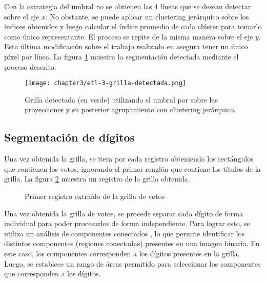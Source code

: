 Con la estrategia del umbral no se obtienen las 4 líneas que se desean detectar sobre el eje $x$. No obstante, se puede
aplicar un clustering jerárquico sobre los índices obtenidos y luego calcular el índice promedio de cada clúster para
tomarlo como único representante. El proceso se repite de la misma manera sobre el eje $y$. Esta última modificación
sobre el trabajo realizado en \parencite{lamagna2016lectura} asegura tener un único píxel por línea. La figura \ref{fig:etl-3-grilla-detectada} muestra
la segmentación detectada mediante el proceso descrito.

\begin{figure}[H]
    \centering
    \texttt{[image: chapter3/etl-3-grilla-detectada.png]}
    \caption[Segmentación de la grilla detectada]{Grilla detectada (en verde) utilizando el umbral por sobre las proyecciones y su posterior agrupamiento con clustering jerárquico.}
    \label{fig:etl-3-grilla-detectada}
\end{figure}

\subsection{Segmentación de dígitos}

Una vez obtenida la grilla, se itera por cada registro obteniendo los rectángulos que contienen los votos, ignorando el
primer renglón que contiene los títulos de la grilla. La figura \ref{fig:etl-4-registro} muestra un registro de la
grilla obtenida.

\begin{figure}[H]
    \centering
    \caption[Primer registro extraído de la grilla de votos]{Primer registro extraído de la grilla de votos}
    \label{fig:etl-4-registro}
\end{figure}

Una vez obtenida la grilla de votos, se procede separar cada dígito de forma individual para poder procesarlos de forma
independiente. Para lograr esto, se utiliza un análisis de componentes conectados \parencite{bolelli2019spaghetti}, lo que permite identificar los distintos componentes (regiones conectadas) presentes en
una imagen binaria. En este caso, los componentes corresponden a los dígitos presentes en la grilla. Luego, se
establece un rango de áreas permitido para seleccionar los componentes que corresponden a los dígitos.

